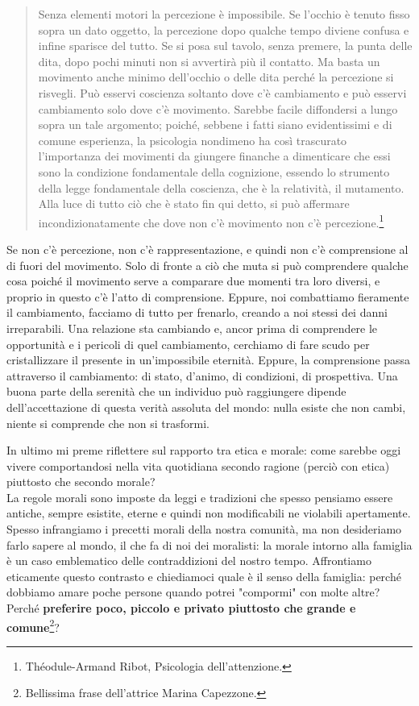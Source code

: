 \begin{quotation}
	\small Senza elementi motori la percezione è impossibile. Se l’occhio è tenuto fisso sopra un dato oggetto, la percezione dopo qualche tempo diviene confusa e infine sparisce del tutto. Se si posa sul tavolo, senza premere, la punta delle dita, dopo pochi minuti non si avvertirà più il contatto. Ma basta un movimento anche minimo dell’occhio o delle dita perché la percezione si risvegli. Può esservi coscienza soltanto dove c’è cambiamento e può esservi cambiamento solo dove c’è movimento. Sarebbe facile diffondersi a lungo sopra un tale argomento; poiché, sebbene i fatti siano evidentissimi e di comune esperienza, la psicologia nondimeno ha così trascurato l’importanza dei movimenti da giungere finanche a dimenticare che essi sono la condizione fondamentale della cognizione, essendo lo strumento della legge fondamentale della coscienza, che è la relatività, il mutamento. Alla luce di tutto ciò che è stato fin qui detto, si può affermare incondizionatamente che dove non c’è movimento non c’è percezione.\footnote{Théodule-Armand Ribot, Psicologia dell'attenzione.}
\end{quotation}

Se  non c'è percezione, non c'è rappresentazione, e quindi non c'è comprensione al di fuori del movimento. Solo di fronte a ciò che muta si può comprendere qualche cosa poiché il movimento serve a comparare due momenti tra loro diversi, e proprio in questo c'è l'atto di comprensione. Eppure, noi combattiamo fieramente il cambiamento, facciamo di tutto per frenarlo, creando a noi stessi dei danni irreparabili. Una relazione sta cambiando e, ancor prima di comprendere le opportunità e i pericoli di quel cambiamento, cerchiamo di fare scudo per cristallizzare il presente in un'impossibile eternità. Eppure, la comprensione passa attraverso il cambiamento: di stato, d'animo, di condizioni, di prospettiva. Una buona parte della serenità che un individuo può raggiungere dipende dell'accettazione di questa verità assoluta del mondo: nulla esiste che non cambi, niente si comprende che non si trasformi.

In ultimo mi preme riflettere sul rapporto tra etica e morale: come sarebbe oggi vivere comportandosi nella vita quotidiana secondo ragione (perciò con etica) piuttosto che secondo morale?\\
La regole morali sono imposte da leggi e tradizioni che spesso pensiamo essere antiche, sempre esistite, eterne e quindi non modificabili ne violabili apertamente. Spesso infrangiamo i precetti morali della nostra comunità, ma non desideriamo farlo sapere al mondo, il che fa di noi dei moralisti: la morale intorno alla famiglia è un caso emblematico delle contraddizioni del nostro tempo.
Affrontiamo eticamente questo contrasto e chiediamoci quale è il senso della famiglia: perché dobbiamo amare poche persone quando  potrei "compormi" con molte altre? Perché \textbf{preferire poco, piccolo e privato piuttosto che grande e comune}\footnote{Bellissima frase dell'attrice Marina Capezzone.}?

